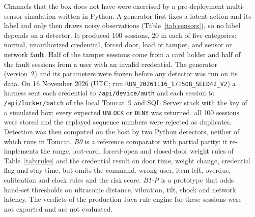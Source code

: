 \documentclass[journal,onecolumn]{IEEEtran}
\begin{document}
Channels that the box does not have were exercised by a pre-deployment multi-sensor simulation written in Python. A
generator first fixes a latent action and its label and only then draws noisy observations (Table~\ref{tab:sensors}),
so no label depends on a detector. It produced 100 sessions, 20 in each of five categories: normal, unauthorized
credential, forced door, load or tamper, and sensor or network fault. Half of the tamper sessions come from a card
holder and half of the fault sessions from a user with an invalid credential. The generator (version~2) and its parameters were frozen
before any detector was run on its data. On 16 November 2026 (UTC; run \texttt{RUN\_20261116\_171508\_SEED42\_V2}) a
harness sent each credential to \texttt{/api/device/auth} and each session to \texttt{/api/locker/batch} of the local
Tomcat~9 and SQL Server stack with the key of a simulated box; every expected \texttt{UNLOCK} or \texttt{DENY} was
returned, all 100 sessions were stored and the replayed sequence numbers were rejected as duplicates. Detection was then computed on the host by two Python detectors,
neither of which runs in Tomcat.
\emph{B0} is a reference comparator with partial parity: it re-implements the range, lost-card, forced-open and
closed-door weight rules of Table~\ref{tab:rules} and the credential result on door time, weight change, credential
flag and stay time, but omits the command, wrong-user, item-left, overdue, calibration and clock rules and the risk
score. \emph{B1-P} is a prototype that adds hand-set thresholds on ultrasonic distance, vibration, tilt, shock and
network latency. The verdicts of the production Java rule engine for these sessions were not exported and are not
evaluated.
\end{document}
